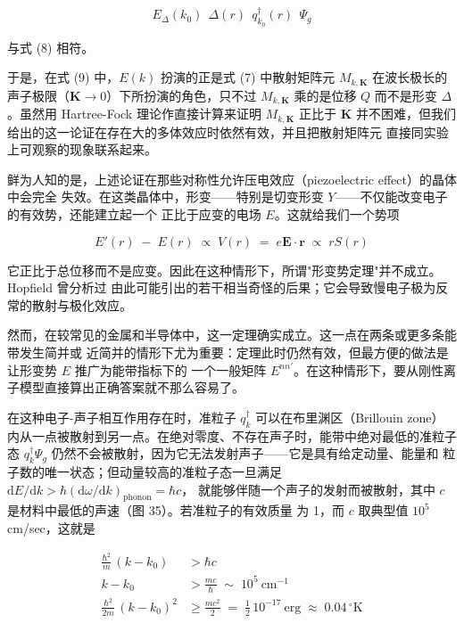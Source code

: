 
\begin{equation*}
E_{\Delta}(k_{0})\;\, \Delta(r)\;\, q_{k_{0}}^{\dagger}(r)\;\, \Psi_{g}
\end{equation*}

与式 (8) 相符。

于是，在式 (9) 中，$E(k)$ 扮演的正是式 (7) 中散射矩阵元 $M_{k,\mathbf{K}}$ 在波长极长的
声子极限（$\mathbf{K}\to 0$）下所扮演的角色，只不过 $M_{k,\mathbf{K}}$ 乘的是位移 $Q$
而不是形变 $\Delta$。虽然用 Hartree-Fock 理论作直接计算来证明 $M_{k,\mathbf{K}}$ 正比于
$\mathbf{K}$ 并不困难，但我们给出的这一论证在存在大的多体效应时依然有效，并且把散射矩阵元
直接同实验上可观察的现象联系起来。

鲜为人知的是，上述论证在那些对称性允许压电效应（piezoelectric effect）的晶体中会完全
失效。在这类晶体中，形变——特别是切变形变 $Y$——不仅能改变电子的有效势，还能建立起一个
正比于应变的电场 $E$。这就给我们一个势项

\begin{equation*}
E'(r) \;-\; E(r) \;\propto\; V(r) \;=\; e\mathbf{E}\cdot\mathbf{r} \;\propto\; rS(r)
\end{equation*}

它正比于总位移而不是应变。因此在这种情形下，所谓"形变势定理"并不成立。Hopfield 曾分析过
由此可能引出的若干相当奇怪的后果；它会导致慢电子极为反常的散射与极化效应。

然而，在较常见的金属和半导体中，这一定理确实成立。这一点在两条或更多条能带发生简并或
近简并的情形下尤为重要：定理此时仍然有效，但最方便的做法是让形变势 $E$ 推广为能带指标下的
一个一般矩阵 $E^{nn'}$。在这种情形下，要从刚性离子模型直接算出正确答案就不那么容易了。

在这种电子-声子相互作用存在时，准粒子 $q_{k}^{\dagger}$ 可以在布里渊区（Brillouin zone）
内从一点被散射到另一点。在绝对零度、不存在声子时，能带中绝对最低的准粒子态
$q_{k}^{\dagger}\Psi_{g}$ 仍然不会被散射，因为它无法发射声子——它是具有给定动量、能量和
粒子数的唯一状态；但动量较高的准粒子态一旦满足
$\mathrm{d}E/\mathrm{d}k > \hbar(\mathrm{d}\omega/\mathrm{d}k)_{\text{phonon}} = \hbar c$，
就能够伴随一个声子的发射而被散射，其中 $c$ 是材料中最低的声速（图 35）。若准粒子的有效质量
为 1，而 $c$ 取典型值 $10^{5}$ cm/sec，这就是

\begin{align*}
\frac{\hbar^{2}}{m}\,(k - k_{0}) &> \hbar c \\
k - k_{0} &> \frac{mc}{\hbar} \;\sim\; 10^{5}\ \text{cm}^{-1} \\
\frac{\hbar^{2}}{2m}\,(k - k_{0})^{2} &\geq \frac{mc^{2}}{2} \;=\; \frac{1}{2}\,10^{-17}\ \text{erg} \;\approx\; 0.04\,^{\circ}\mathrm{K}
\end{align*}

